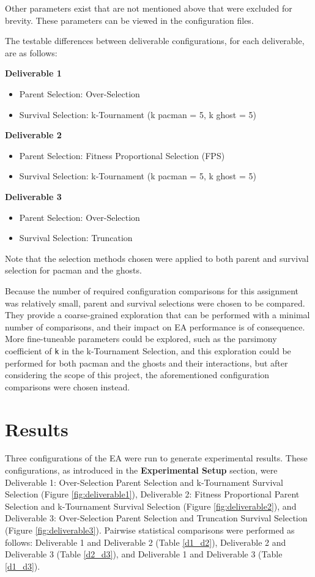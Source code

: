 \documentclass[11pt]{article}
\begin{document}
Other parameters exist that are not mentioned above that were excluded for brevity. These parameters can be 
viewed in the configuration files.

The testable differences between deliverable configurations, for each deliverable, are as follows:

\textbf{Deliverable 1}
\begin{itemize}[leftmargin=.8in]
    \item Parent Selection: Over-Selection
    \item Survival Selection: k-Tournament (k pacman = 5, k ghost = 5)
\end{itemize}

\textbf{Deliverable 2}
\begin{itemize}[leftmargin=.8in]
    \item Parent Selection: Fitness Proportional Selection (FPS)
    \item Survival Selection: k-Tournament (k pacman = 5, k ghost = 5)
\end{itemize}

\textbf{Deliverable 3}
\begin{itemize}[leftmargin=.8in]
    \item Parent Selection: Over-Selection
    \item Survival Selection: Truncation
\end{itemize}

Note that the selection methods chosen were applied to both parent and survival selection for pacman and the ghosts.

Because the number of required configuration comparisons for this assignment was relatively small, parent and
survival selections were chosen to be compared. They provide a coarse-grained exploration that can be
performed with a minimal number of comparisons, and their impact on EA performance is of consequence. More fine-tuneable
parameters could be explored, such as the parsimony coefficient of \texttt{k} in the k-Tournament Selection, and this exploration could be performed for both
pacman and the ghosts and their interactions, but after considering the scope of this project, the aforementioned configuration
comparisons were chosen instead.


\section{Results}
Three configurations of the EA were run to generate experimental results. These configurations, as introduced in the 
\textbf{Experimental Setup} section, were Deliverable 1: Over-Selection Parent 
Selection and k-Tournament Survival Selection (Figure \ref{fig:deliverable1}), Deliverable 2: Fitness Proportional 
Parent Selection and k-Tournament Survival Selection (Figure \ref{fig:deliverable2}), and Deliverable 3: Over-Selection Parent Selection 
and Truncation Survival Selection (Figure \ref{fig:deliverable3}). Pairwise statistical comparisons were performed as follows:
Deliverable 1 and Deliverable 2 (Table \ref{d1_d2}), Deliverable 2 and Deliverable 3 (Table \ref{d2_d3}), and Deliverable 1 and Deliverable
3 (Table \ref{d1_d3}).
\end{document}
